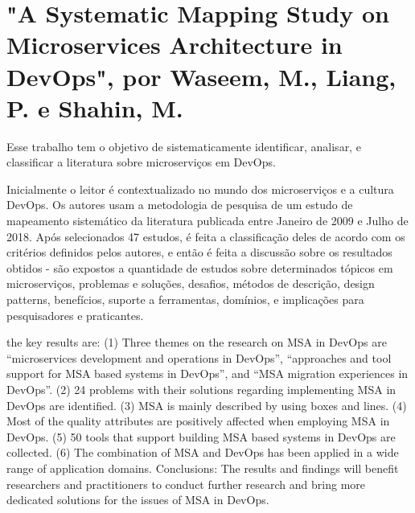 \section*{"A Systematic Mapping Study on Microservices Architecture in DevOps", por Waseem, M., Liang, P. e Shahin, M.}

Esse trabalho tem o objetivo de sistematicamente identificar, analisar, e classificar a literatura sobre microserviços em DevOps.

Inicialmente o leitor é contextualizado no mundo dos microserviços e a cultura DevOps. Os autores usam a metodologia de pesquisa de um estudo de mapeamento sistemático da literatura publicada entre Janeiro de 2009 e Julho de 2018. Após selecionados 47 estudos, é feita a classificação deles de acordo com os critérios definidos pelos autores, e então é feita a discussão sobre os resultados obtidos - são expostos a quantidade de estudos sobre determinados tópicos em microserviços, problemas e soluções, desafios, métodos de descrição, design patterns, benefícios, suporte a ferramentas, domínios, e implicações para pesquisadores e praticantes.

the key results are: (1) Three themes on the research on MSA in DevOps are “microservices development and operations in DevOps”, “approaches and tool support for MSA based systems in DevOps”, and “MSA migration experiences in DevOps”. (2) 24 problems with their solutions regarding implementing MSA in DevOps are identified. (3) MSA is mainly described by using boxes and lines. (4) Most of the quality attributes are positively affected when employing MSA in DevOps. (5) 50 tools that support building MSA based systems in DevOps are collected. (6) The combination of MSA and DevOps has been applied in a wide range of application domains. Conclusions: The results and findings will benefit researchers and practitioners to conduct further research and bring more dedicated solutions for the issues of MSA in DevOps.

